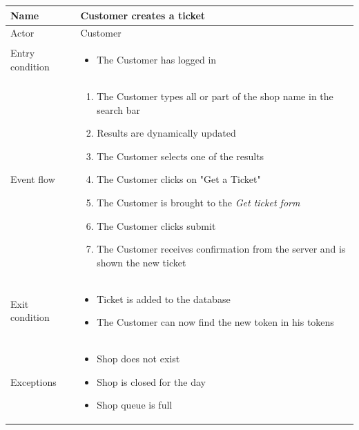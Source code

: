 \begin{table}[H]
    \begin{tabu} to \textwidth {|X|X[4]|}
        \hline
        Name            & Customer creates a ticket  \\ \hline
        Actor           & Customer                   \\ \hline
        Entry condition & \begin{itemize}
            \item The Customer has logged in
        \end{itemize} \\ \hline
        Event flow      & \begin{enumerate}
            \item The Customer types all or part of the shop name in the search bar
            \item Results are dynamically updated
            \item The Customer selects one of the results
            \item The Customer clicks on "Get a Ticket"
            \item The Customer is brought to the \emph{Get ticket form}
            \item The Customer clicks submit
            \item The Customer receives confirmation from the server and is shown the new ticket
        \end{enumerate} \\ \hline
        Exit condition  & \begin{itemize}
            \item Ticket is added to the database
            \item The Customer can now find the new token in his tokens
        \end{itemize} \\ \hline
        Exceptions      & \begin{itemize}
            \item Shop does not exist
            \item Shop is closed for the day
            \item Shop queue is full
        \end{itemize} \\ \hline
    \end{tabu}
\end{table}

